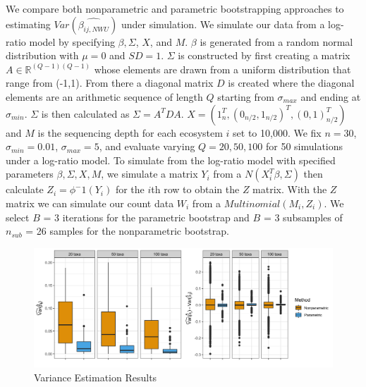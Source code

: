 \documentclass{article}
\begin{document}
We compare both nonparametric and parametric bootstrapping approaches to estimating $Var(\hat{\beta_{ij,NWU}})$ under simulation. We simulate our data from a log-ratio model by specifying $\beta, \Sigma$, $X$, and $M$. $\beta$ is generated from a random normal distribution with $\mu = 0$ and $SD = 1$. $\Sigma$ is constructed by first creating a matrix $A \in \mathbb{R}^{(Q-1)(Q-1)}$ whose elements are drawn from a uniform distribution that range from (-1,1). From there a diagonal matrix $D$ is created where the diagonal elements are an arithmetic sequence of length $Q$ starting from $\sigma_{max}$ and ending at $\sigma_{min}$. $\Sigma$ is then calculated as $\Sigma = A^{T}DA$.  $X =(1_n^{T}, (0_{n/2},1_{n/2})^{T},(0,1)_{n/2}^{T})$ and $M$ is the sequencing depth for each ecosystem $i$ set to 10,000. We fix $n = 30$, $\sigma_{min}=0.01$, $\sigma_{max}= 5$, and evaluate varying $Q = 20, 50, 100$ for 50 simulations under a log-ratio model. To simulate from the log-ratio model with specified parameters $\beta, \Sigma, X, M$, we simulate a matrix $Y_i$ from a  $N(X_{i}^{T}\beta,\Sigma)$ then calculate $Z_i = \phi^-1(Y_i)$ for the $i$th row to obtain the $Z$ matrix. With the $Z$ matrix we can simulate our count data $W_i$ from a $Multinomial(M_i,Z_i)$. We select $B$ = 3 iterations for the parametric bootstrap and $B$ = 3 subsamples of $n_{sub}$ = 26 samples for the nonparametric bootstrap.

\begin{figure}[!htb]
  \captionsetup{singlelinecheck = false, format= hang, justification = raggedright, font = sf, labelsep = space}
   \caption{Variance Estimation Results}
  \centering
    \includegraphics[width=\textwidth]{variance_plots2.png}
\end{figure}
\end{document}
